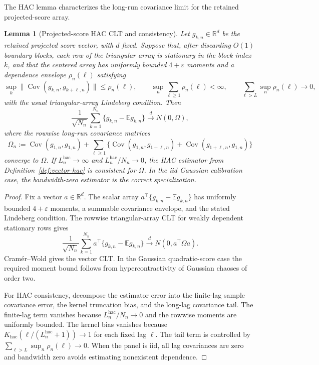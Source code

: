 \documentclass[11pt,a4paper]{amsart}
\theoremstyle{plain}
\newtheorem{lemma}[theorem]{Lemma}
\theoremstyle{definition}
\theoremstyle{remark}
\DeclareMathOperator{\Cov}{Cov}
\newcommand{\R}{\mathbb{R}}
\newcommand{\EE}{\mathbb{E}}
\newcommand{\toD}{\xrightarrow{d}}
\begin{document}
The HAC lemma characterizes the long-run covariance limit for the retained projected-score array.

\begin{lemma}[Projected-score HAC CLT and consistency]\label{lem:projected-hac-clt}
Let \(g_{k,n}\in\R^d\) be the retained projected score vector, with \(d\) fixed.  Suppose that,
after discarding \(O(1)\) boundary blocks, each row of the triangular array is stationary in the
block index \(k\), and that the centered array has uniformly bounded \(4+\varepsilon\) moments and
a dependence envelope \(\rho_n(\ell)\) satisfying
\[
        \sup_{k}\|\Cov(g_{k,n},g_{k+\ell,n})\|\le \rho_n(\ell),
        \qquad
        \sup_n\sum_{\ell\ge1}\rho_n(\ell)<\infty,
        \qquad
        \sum_{\ell>L}\sup_n\rho_n(\ell)\to0,
\]
with the usual triangular-array Lindeberg condition.  Then
\[
        \frac1{\sqrt{N_n}}\sum_{k=1}^{N_n}
        \{g_{k,n}-\EE g_{k,n}\}
        \toD N(0,\Omega),
\]
where the rowwise long-run covariance matrices
\[
        \Omega_n
        :=
        \Cov(g_{1,n},g_{1,n})
        +
        \sum_{\ell\ge1}
        \{\Cov(g_{1,n},g_{1+\ell,n})+\Cov(g_{1+\ell,n},g_{1,n})\}
\]
converge to \(\Omega\).  If \(L_n^{\mathrm{hac}}\to\infty\) and \(L_n^{\mathrm{hac}}/N_n\to0\),
the HAC estimator from Definition~\ref{def:vector-hac} is consistent for \(\Omega\).  In the iid
Gaussian calibration case, the bandwidth-zero estimator is the correct specialization.
\end{lemma}

\begin{proof}
Fix a vector \(a\in\R^d\).  The scalar array
\(a^\top\{g_{k,n}-\EE g_{k,n}\}\) has uniformly bounded \(4+\varepsilon\) moments, a summable
covariance envelope, and the stated Lindeberg condition.  The rowwise triangular-array CLT for
weakly dependent stationary rows gives
\[
        \frac1{\sqrt{N_n}}\sum_{k=1}^{N_n}
        a^\top\{g_{k,n}-\EE g_{k,n}\}
        \toD
        N(0,a^\top\Omega a).
\]
Cram\'er--Wold gives the vector CLT.  In the Gaussian quadratic-score case the required moment
bound follows from hypercontractivity of Gaussian chaoses of order two.

For HAC consistency, decompose the estimator error into the finite-lag sample covariance error, the
kernel truncation bias, and the long-lag covariance tail.  The finite-lag term vanishes because
\(L_n^{\mathrm{hac}}/N_n\to0\) and the rowwise moments are uniformly bounded.  The kernel bias
vanishes because \(K_{\mathrm{hac}}(\ell/(L_n^{\mathrm{hac}}+1))\to1\) for each fixed lag \(\ell\).
The tail term is controlled by
\(\sum_{\ell>L}\sup_n\rho_n(\ell)\to0\).  When the panel is iid, all lag covariances are zero
and bandwidth zero avoids estimating nonexistent dependence.
\end{proof}
\end{document}
